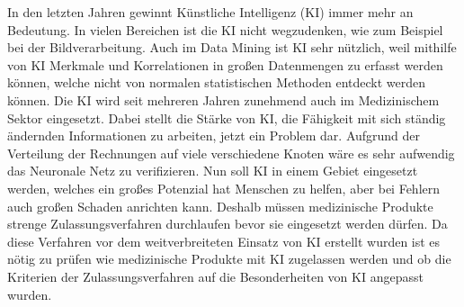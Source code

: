 In den letzten Jahren gewinnt Künstliche Intelligenz (KI) immer mehr an Bedeutung. In vielen Bereichen ist die KI nicht wegzudenken, wie zum Beispiel bei der Bildverarbeitung. Auch im Data Mining ist KI sehr nützlich, weil mithilfe von KI Merkmale und Korrelationen in großen Datenmengen zu erfasst werden können, welche nicht von normalen statistischen Methoden entdeckt werden können. Die KI wird seit mehreren Jahren zunehmend auch im Medizinischem Sektor eingesetzt. Dabei stellt die Stärke von KI, die Fähigkeit mit sich ständig ändernden Informationen zu arbeiten, jetzt ein Problem dar. Aufgrund der Verteilung der Rechnungen auf viele verschiedene Knoten wäre es sehr aufwendig das Neuronale Netz zu verifizieren. Nun soll KI in einem Gebiet eingesetzt werden, welches ein großes Potenzial hat Menschen zu helfen, aber bei Fehlern auch großen Schaden anrichten kann. Deshalb müssen medizinische Produkte strenge Zulassungsverfahren durchlaufen bevor sie eingesetzt werden dürfen. Da diese Verfahren vor dem weitverbreiteten Einsatz von KI erstellt wurden ist es nötig zu prüfen wie medizinische Produkte mit KI zugelassen werden und ob die Kriterien der Zulassungsverfahren auf die Besonderheiten von KI angepasst wurden.